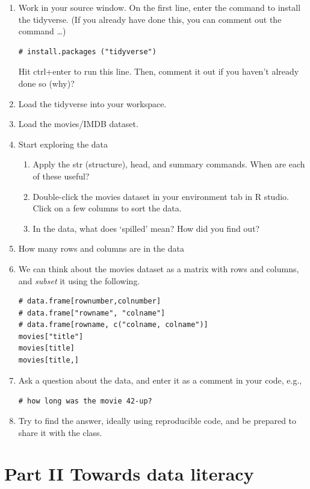 \documentclass[
  openany]{book}
\providecommand{\tightlist}{%
  \setlength{\itemsep}{0pt}\setlength{\parskip}{0pt}}
\begin{document}
\begin{enumerate}
\def\labelenumi{\arabic{enumi}.}
\item
  Work in your source window. On the first line, enter the command to install the tidyverse. (If you already have done this, you can comment out the command \ldots)

\begin{verbatim}
# install.packages ("tidyverse")
\end{verbatim}

  Hit ctrl+enter to run this line. Then, comment it out if you haven't already done so (why)?
\item
  Load the tidyverse into your workspace.
\item
  Load the movies/IMDB dataset.
\item
  Start exploring the data

  \begin{enumerate}
  \def\labelenumii{\arabic{enumii}.}
  \tightlist
  \item
    Apply the str (structure), head, and summary commands. When are each of these useful?
  \item
    Double-click the movies dataset in your environment tab in R studio. Click on a few columns to sort the data.
  \item
    In the data, what does `spilled' mean? How did you find out?
  \end{enumerate}
\item
  How many rows and columns are in the data
\item
  We can think about the movies dataset as a matrix with rows and columns, and \emph{subset} it using the following.

\begin{verbatim}
# data.frame[rownumber,colnumber]
# data.frame["rowname", "colname"]
# data.frame[rowname, c("colname, colname")]
movies["title"]
movies[title]
movies[title,]
\end{verbatim}
\item
  Ask a question about the data, and enter it as a comment in your code, e.g.,

  \texttt{\#\ how\ long\ was\ the\ movie\ 42-up?}
\item
  Try to find the answer, ideally using reproducible code, and be prepared to share it with the class.
\end{enumerate}

\hypertarget{part-part-ii-towards-data-literacy}{%
\part{Part II Towards data literacy}\label{part-part-ii-towards-data-literacy}}
\end{document}

